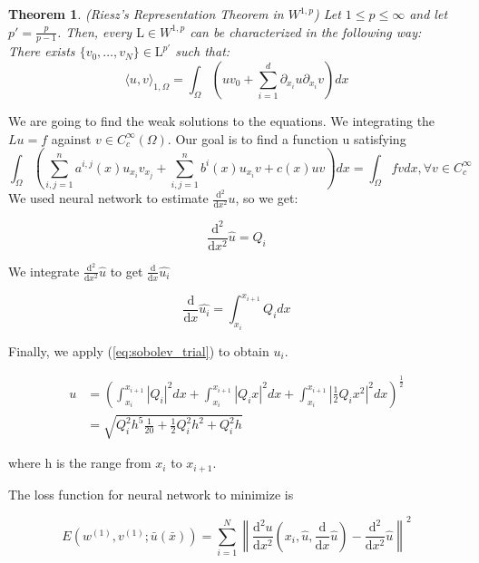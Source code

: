 \documentclass{article}
\newtheorem{theorem}{Theorem}[section]
\begin{document}
\begin{theorem}
	(Riesz's Representation Theorem in $W^{1,p}$) Let $1 \leq p \leq \infty$ and let $p'=\frac{p}{p-1}$. Then, every $\mathrm{L} \in W^{1,p}$ can be characterized in the following way:\\
	There exists $\{v_0, \dots, v_N\} \in \mathrm{L}^{p'}$ such that:
	\[\langle u,v\rangle_{1,\Omega} = \int_{\Omega}\left(uv_{0}+\sum_{i=1}^{d}\partial_{x_i} u \partial_{x_i} v\right)dx\]
\end{theorem}

We are going to find the weak solutions to the equations. We integrating the $Lu=f$ against $v \in C_{c}^{\infty}(\Omega)$. Our goal is to find a function u satisfying
\begin{equation}
\int_{\Omega} \left(\sum_{i,j=1}^{n}a^{i,j}(x)u_{x_i}v_{x_j}+\sum_{i,j=1}^{n}b^{i}(x)u_{x_i}v + c(x)uv\right) dx = \int_{\Omega}fv dx, \forall v \in C_{c}^{\infty}
\end{equation}
 \medspace \noindent
We used neural network to estimate $\frac{\mathrm{d}^{2}}{\mathrm{d}x^{2}}u$, so we get:

\begin{equation}
\frac{\mathrm{d}^{2}}{\mathrm{d}x^{2}}\hat{u} = Q_{i} 
\end{equation}\label{eq:sobolev_trial}
 
 We integrate $\frac{\mathrm{d}^{2}}{\mathrm{d}x^{2}}\hat{u}$ to get $\frac{\mathrm{d}}{\mathrm{d}x}\hat{u_{i}}$
 
 \begin{equation}
\frac{\mathrm{d}}{\mathrm{d}x}\hat{u_{i}} = \int_{x_{i}}^{x_{i+1}}Q_{i} dx
 \end{equation}
 
 Finally, we apply (\ref{eq:sobolev_trial}) to obtain $u_{i}$. 	
 
 \begin{equation}
 \begin{aligned}
 u &= \left(\int_{x_{i}}^{x_{i+1}} \left|Q_{i} \right|^{2} dx+\int_{x_{i}}^{x_{i+1}} \left|Q_{i}x \right|^{2} dx +
 \int_{x_{i}}^{x_{i+1}} \left|\frac{1}{2}Q_{i}x^{2} \right|^{2} dx
  \right)^{\frac{1}{2}} \\
 &=\sqrt{Q_{i} ^{2}h^{5}\frac{1}{20} + \frac{1}{2}Q_{i}^{2}h^{2} + Q_{i}^{2}h}
\end{aligned}
 \end{equation}

where h is the range from $x_{i}$ to $x_{i+1}$. 

The loss function for neural network to minimize is 

\begin{equation}
E(w^{(1)},v^{(1)};\bar{u}(\bar{x})) = \sum_{i=1}^{N}\left \|  \frac{\mathrm{d}^{2}u}{\mathrm{d}x^{2}}\left(x_{i},\hat{u},\frac{\mathrm{d}}{\mathrm{d}x}\hat{u}\right)- \frac{\mathrm{d}^{2}}{\mathrm{d}x^{2}}\hat{u} \right\|^{2}
\end{equation}





	
	
	

	
	
	
\end{document}

